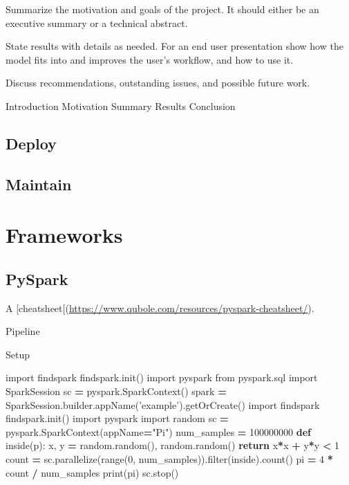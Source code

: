 \documentclass[]{book}
\newenvironment{Shaded}{\begin{snugshade}}{\end{snugshade}}
\newcommand{\KeywordTok}[1]{\textcolor[rgb]{0.13,0.29,0.53}{\textbf{#1}}}
\newcommand{\DecValTok}[1]{\textcolor[rgb]{0.00,0.00,0.81}{#1}}
\newcommand{\StringTok}[1]{\textcolor[rgb]{0.31,0.60,0.02}{#1}}
\newcommand{\ImportTok}[1]{#1}
\newcommand{\ControlFlowTok}[1]{\textcolor[rgb]{0.13,0.29,0.53}{\textbf{#1}}}
\newcommand{\OperatorTok}[1]{\textcolor[rgb]{0.81,0.36,0.00}{\textbf{#1}}}
\newcommand{\BuiltInTok}[1]{#1}
\newcommand{\NormalTok}[1]{#1}
\theoremstyle{definition}
\theoremstyle{definition}
\theoremstyle{definition}
\theoremstyle{remark}
\begin{document}
Summarize the motivation and goals of the project. It should either be
an executive summary or a technical abstract.

State results with details as needed. For an end user presentation show
how the model fits into and improves the user's workflow, and how to use
it.

Discuss recommendations, outstanding issues, and possible future work.

Introduction \textbar{} Motivation \textbar{} Summary \textbar{} Results
\textbar{} Conclusion

\section{Deploy}\label{deploy}

\section{Maintain}\label{maintain}

\chapter{Frameworks}\label{frameworks}

\section{PySpark}\label{pyspark}

A
{[}cheatsheet{[}(\url{https://www.qubole.com/resources/pyspark-cheatsheet/}).

Pipeline

Setup

\begin{Shaded}
\begin{Highlighting}[]
\ImportTok{import}\NormalTok{ findspark}
\NormalTok{findspark.init()}
\ImportTok{import}\NormalTok{ pyspark}
\ImportTok{from}\NormalTok{ pyspark.sql }\ImportTok{import}\NormalTok{ SparkSession}
\NormalTok{sc }\OperatorTok{=}\NormalTok{ pyspark.SparkContext()}
\NormalTok{spark }\OperatorTok{=}\NormalTok{ SparkSession.builder.appName(}\StringTok{'example'}\NormalTok{).getOrCreate()}
\ImportTok{import}\NormalTok{ findspark}
\NormalTok{findspark.init()}
\ImportTok{import}\NormalTok{ pyspark}
\ImportTok{import}\NormalTok{ random}
\NormalTok{sc }\OperatorTok{=}\NormalTok{ pyspark.SparkContext(appName}\OperatorTok{=}\StringTok{"Pi"}\NormalTok{)}
\NormalTok{num_samples }\OperatorTok{=} \DecValTok{100000000}
\KeywordTok{def}\NormalTok{ inside(p):     }
\NormalTok{    x, y }\OperatorTok{=}\NormalTok{ random.random(), random.random()}
    \ControlFlowTok{return}\NormalTok{ x}\OperatorTok{*}\NormalTok{x }\OperatorTok{+}\NormalTok{ y}\OperatorTok{*}\NormalTok{y }\OperatorTok{<} \DecValTok{1}
\NormalTok{count }\OperatorTok{=}\NormalTok{ sc.parallelize(}\BuiltInTok{range}\NormalTok{(}\DecValTok{0}\NormalTok{, num_samples)).}\BuiltInTok{filter}\NormalTok{(inside).count()}
\NormalTok{pi }\OperatorTok{=} \DecValTok{4} \OperatorTok{*}\NormalTok{ count }\OperatorTok{/}\NormalTok{ num_samples}
\BuiltInTok{print}\NormalTok{(pi)}
\NormalTok{sc.stop()}
\end{Highlighting}
\end{Shaded}
\end{document}

